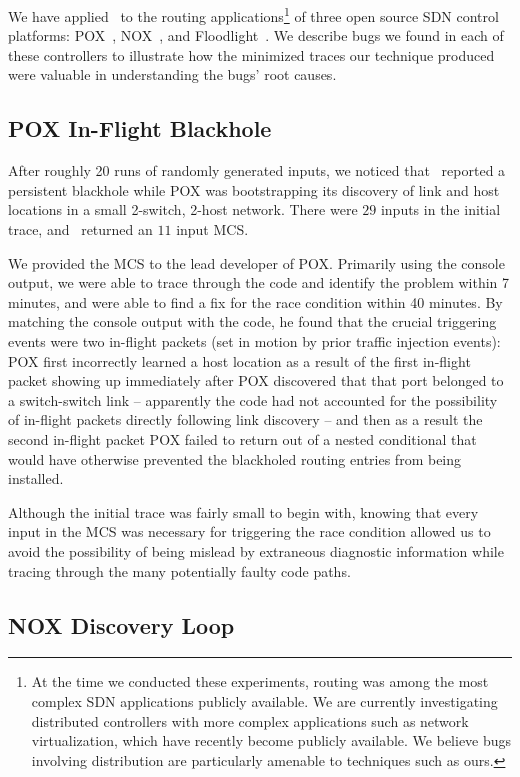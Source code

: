 We have applied \projectname~to the routing applications\footnote{At the time
we conducted these experiments, routing was among the most complex
SDN applications publicly available. We are currently investigating
distributed controllers with more complex applications such as network virtualization,
which have recently become publicly available. We believe bugs involving
distribution are particularly amenable to techniques such as ours.} of three open
source SDN control platforms:
POX~\cite{pox}, NOX~\cite{nox}, and Floodlight~\cite{bigswitch}. We describe
bugs we found in each of these controllers to illustrate
how the minimized traces our technique produced were valuable in
understanding the bugs' root causes.

\subsection{POX In-Flight Blackhole}
After roughly 20 runs of randomly generated inputs,
we noticed that \projectname~reported a persistent blackhole while
POX was bootstrapping its
discovery of link and host locations in a small 2-switch, 2-host network.
There were $29$ inputs in the initial trace, and \projectname~returned an $11$ input
MCS.

We provided the MCS to the lead developer of POX. Primarily using the
console output, we were able to trace through the code and identify the problem
within 7 minutes, and were able to find a fix for the race condition within 40
minutes. By matching the console output with the code, he found that the crucial
triggering events were two
in-flight packets (set in motion by prior traffic injection events):
POX first incorrectly learned a host location as a result of the first in-flight
packet showing up immediately after POX discovered that that port belonged to
a switch-switch link -- apparently the code had not accounted for the
possibility of in-flight packets directly following link discovery -- and
then as a result the
second in-flight packet
POX failed to return out of a nested conditional that would have
otherwise prevented the blackholed routing entries from being installed.

Although the initial trace was fairly small to begin with, knowing that every
input in the MCS was necessary for triggering the race condition allowed us to
avoid the
possibility of being mislead by extraneous diagnostic information while
tracing through the many potentially faulty code paths.

\subsection{NOX Discovery Loop}

